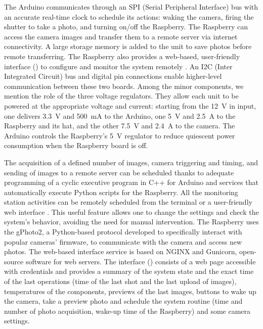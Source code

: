 The Arduino communicates through an SPI (Serial Peripheral Interface) bus with an accurate real-time clock to schedule its actions: waking the camera, firing the shutter to take a photo, and turning on/off the Raspberry. 
The Raspberry can access the camera images and transfer them to a remote server via internet connectivity. 
A large storage memory is added to the unit to save photos before remote transferring. 
The Raspberry also provides a web-based, user-friendly interface () to configure and monitor the system remotely
\citep{greig}.
An I2C (Inter Integrated Circuit) bus and digital pin connections enable higher-level communication between these two boards. 
Among the minor components, we mention the role of the three voltage regulators. 
They allow each unit to be powered at the appropriate voltage and current: starting from the 12~V in input, one delivers 3.3~V and 500~mA to
the Arduino, one 5~V and 2.5~A to the Raspberry and its hat, and the other 7.5~V and 2.4~A to the camera.
The Arduino controls the Raspberry's 5~V regulator to reduce quiescent power consumption when the Raspberry board is off.

The acquisition of a defined number of images, camera triggering and timing, and sending of images to a remote server can be scheduled thanks to adequate programming of a cyclic executive program in C++ for Arduino and services that automatically execute Python scripts for the Raspberry.
All the monitoring station activities can be remotely scheduled from the terminal or a user-friendly web interface \citep{greig}. 
This useful feature allows one to change the settings and check the system's behavior, avoiding the need for manual intervention. 
The Raspberry uses the gPhoto2, a Python-based protocol developed to specifically interact with popular cameras’ firmware, to communicate with the camera and access new photos. 
The web-based interface service is based on NGINX and Gunicorn, open-source software for web servers. 
The interface () consists of a web page accessible with credentials and provides a summary of the system state and the exact time of the last operations (time of the last shot and the last upload of images), temperatures of the components, previews of the last images, buttons to wake up the camera, take a preview photo and schedule the system routine (time and number of photo acquisition, wake-up time of the Raspberry) and some camera settings.

